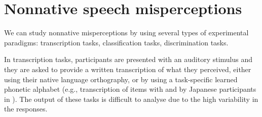 \section{Nonnative speech misperceptions}


We can study nonnative misperceptions by using several types of experimental paradigms: transcription tasks, classification tasks, discrimination tasks.

In transcription tasks, participants are presented with an auditory stimulus and they are asked to provide a written transcription of what they perceived, either using their native language orthography, or by using a task-specific learned phonetic alphabet (e.g., transcription of items with  and  by Japanese participants in \cite{best1992}). The output of these tasks is difficult to analyse due to the high variability in the responses.


